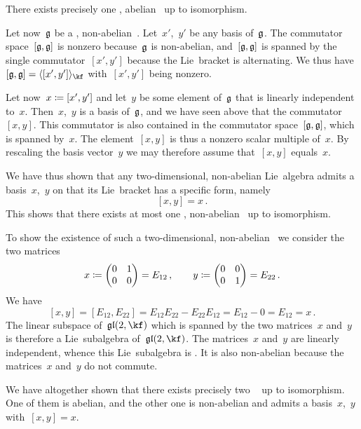 \begin{example}
	There exists precisely one {\twodimensional}, abelian~\liealgebra{$\kf$} up to isomorphism.

	Let now~$\mathfrak{g}$ be a {\twodimensional}, non-abelian~\liealgebra{$\kf$}.
	Let~$x'$,~$y'$ be any basis of~$\mathfrak{g}$.
	The commutator space~$[\mathfrak{g}, \mathfrak{g}]$ is nonzero because~$\mathfrak{g}$ is non-abelian, and~$[\mathfrak{g}, \mathfrak{g}]$ is spanned by the single commutator~$[x',y']$ because the Lie~bracket is alternating.
	We thus have~$[\glie, \glie] = \gen{ [x', y'] }_{\kf}$ with~$[x', y']$ being nonzero.

	Let now~$x \coloneqq [x',y']$ and let~$y$ be some element of~$\mathfrak{g}$ that is linearly independent to~$x$.
	Then~$x$,~$y$ is a basis of~$\mathfrak{g}$, and we have seen above that the commutator~$[x,y]$.
	This commutator is also contained in the commutator space~$[\mathfrak{g}, \mathfrak{g}]$, which is spanned by~$x$.
	The element~$[x,y]$ is thus a nonzero scalar multiple of~$x$.
	By rescaling the basis vector~$y$ we may therefore assume that~$[x,y]$ equals~$x$.

	We have thus shown that any two-dimensional, non-abelian Lie~algebra admits a basis~$x$,~$y$ on that its Lie~bracket has a specific form, namely
	\[
		[x,y] = x \,.
	\]
	This shows that there exists at most one {\twodimensional}, non-abelian~\liealgebra{$\kf$} up to isomorphism.

	To show the existence of such a two-dimensional, non-abelian~\liealgebra{$\kf$} we consider the two matrices
	\[
		x
		\coloneqq
		\begin{pmatrix}
			0 & 1 \\
			0 & 0
		\end{pmatrix}
		=
		E_{12}  \,,
		\qquad
		y
		\coloneqq
		\begin{pmatrix}
			0 & 0 \\
			0 & 1
		\end{pmatrix}
		=
		E_{22}  \,.
	\]
	We have
	\[
		[x,y]
		=
		[E_{12}, E_{22}]
		=
		E_{12} E_{22} - E_{22} E_{12}
		=
		E_{12} - 0
		=
		E_{12}
		=
		x \,.
	\]
	The linear subspace of~$\gllie(2, \kf)$ which is spanned by the two matrices~$x$ and~$y$ is therefore a Lie~subalgebra of~$\gllie(2, \kf)$.
	The matrices~$x$ and~$y$ are linearly independent, whence this Lie~subalgebra is {\twodimensional}.
	It is also non-abelian because the matrices~$x$ and~$y$ do not commute.

	We have altogether shown that there exists precisely two {\twodimensional}~\liealgebras{$\kf$} up to isomorphism.
	One of them is abelian, and the other one is non-abelian and admits a basis~$x$,~$y$ with~$[x,y] = x$.
\end{example}


